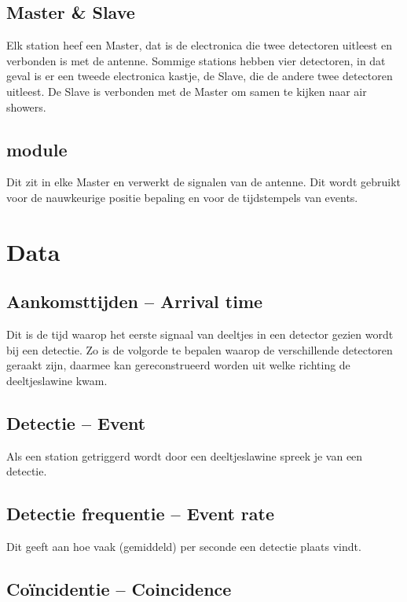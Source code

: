 \subsection{Master \& Slave}

Elk station heef een Master, dat is de \hisparc electronica die twee
detectoren uitleest en verbonden is met de \gps antenne. Sommige
stations hebben vier detectoren, in dat geval is er een tweede \hisparc
electronica kastje, de Slave, die de andere twee detectoren uitleest. De
Slave is verbonden met de Master om samen te kijken naar air showers.


\subsection{\gps module}

Dit zit in elke Master en verwerkt de signalen van de \gps antenne. Dit
wordt gebruikt voor de nauwkeurige positie bepaling en voor de
tijdstempels van events.


\section{Data}


\subsection{Aankomsttijden -- Arrival time}

Dit is de tijd waarop het eerste signaal van deeltjes in een detector
gezien wordt bij een detectie. Zo is de volgorde te bepalen waarop de
verschillende detectoren geraakt zijn, daarmee kan gereconstrueerd worden
uit welke richting de deeltjeslawine kwam.


\subsection{Detectie -- Event}

Als een station getriggerd wordt door een deeltjeslawine spreek je van
een detectie.


\subsection{Detectie frequentie -- Event rate}

Dit geeft aan hoe vaak (gemiddeld) per seconde een detectie plaats vindt.


\subsection{Coïncidentie -- Coincidence}

